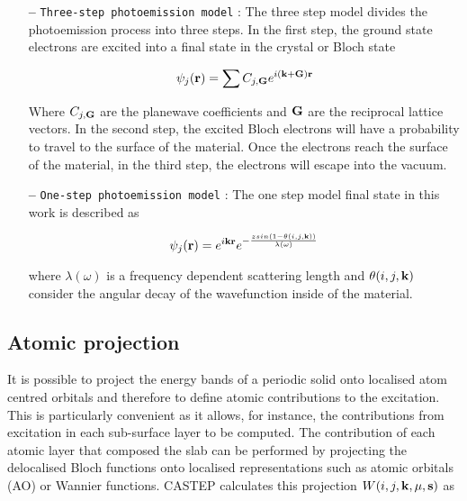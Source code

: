 \documentclass[a4paper,11pt,twoside]{book}
\begin{document}
\begin{itemize}
\item[{\bf --}]  \verb#Three-step photoemission model# : The three step model divides the photoemission process into three steps. In the first step, the ground state electrons are excited into a final state in the crystal or Bloch state

\begin{equation}
\psi_{j}{(\bf{r})} = \sum C_{j,\bf{G}} e^{i(\bf{k}+\bf{G})\bf{r}}
    \label{bloch_wave}
\end{equation}

Where $C_{j,\bf{G}}$ are the planewave coefficients and $\bf{G}$ are the reciprocal lattice vectors. In the second step, the excited Bloch electrons will have a probability to travel to the surface of the material. Once the electrons reach the surface of the material, in the third step, the electrons will escape into the vacuum.

\item[{\bf --}]  \verb#One-step photoemission model# : The one step model final state in this work is described as

\begin{equation}
\psi_{j}{(\bf{r})} = e^{i \bf{k}\bf{r}}e^{-\frac{z sin (1-\theta (i,j,\bf{k}))}{\lambda(\omega) }}
    \label{1_final_electron_wave}
\end{equation}

where $\lambda(\omega)$ is a frequency dependent scattering length and $\theta (i,j,\bf{k})$ consider the angular decay of the wavefunction inside of the material.

\end{itemize}

\subsection{Atomic projection}

It is possible to project the energy bands of a periodic solid onto localised atom centred orbitals and therefore to define atomic contributions to the excitation. This is particularly convenient as it allows, for instance, the contributions from excitation in each sub-surface layer to be  computed. The contribution of each atomic layer that composed the slab can be performed by projecting the delocalised Bloch functions onto localised representations such as atomic orbitals (AO) or Wannier functions. CASTEP calculates this projection $W(i, j,\bf{k}, \mu,s)$ as
\end{document}
